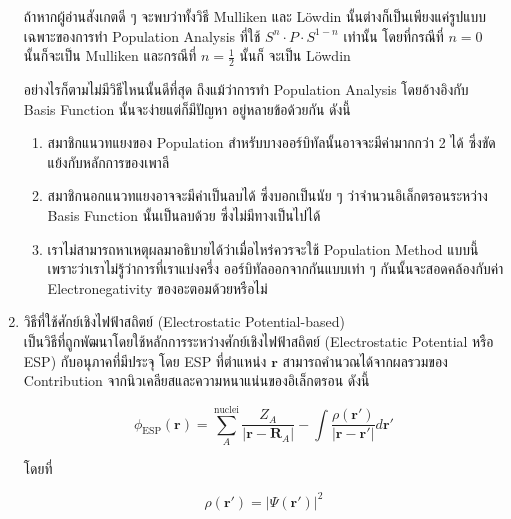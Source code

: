 \begin{enumerate}
        ถ้าหากผู้อ่านสังเกตดี ๆ จะพบว่าทั้งวิธี Mulliken และ L\"{o}wdin นั้นต่างก็เป็นเพียงแค่รูปแบบเฉพาะของการทำ Population Analysis 
        ที่ใช้ $S^{n} \cdot P \cdot S^{1-n}$ เท่านั้น โดยที่กรณีที่ $n=0$ นั้นก็จะเป็น Mulliken และกรณีที่ $n=\frac{1}{2}$ นั้นก็%
        จะเป็น L\"{o}wdin

        อย่างไรก็ตามไม่มีวิธีไหนนั้นดีที่สุด ถึงแม้ว่าการทำ Population Analysis โดยอ้างอิงกับ Basis Function นั้นจะง่ายแต่ก็มีปัญหา%
        อยู่หลายข้อด้วยกัน ดังนี้ 

        \begin{enumerate}[topsep=0pt]
            \item สมาชิกแนวทแยงของ Population สำหรับบางออร์บิทัลนั้นอาจจะมีค่ามากกว่า 2 ได้ ซึ่งขัดแย้งกับหลักการของเพาลี
            
            \item สมาชิกนอกแนวทแยงอาจจะมีค่าเป็นลบได้ ซึ่งบอกเป็นนัย ๆ ว่าจำนวนอิเล็กตรอนระหว่าง Basis Function นั้นเป็นลบด้วย%
            ซึ่งไม่มีทางเป็นไปได้

            \item เราไม่สามารถหาเหตุผลมาอธิบายได้ว่าเมื่อไหร่ควรจะใช้ Population Method แบบนี้เพราะว่าเราไม่รู้ว่าการที่เราแบ่งครึ่ง%
            ออร์บิทัลออกจากกันแบบเท่า ๆ กันนั้นจะสอดคล้องกับค่า Electronegativity ของอะตอมด้วยหรือไม่
        \end{enumerate}
    
    \item วิธีที่ใช้ศักย์เชิงไฟฟ้าสถิตย์ (Electrostatic Potential-based) \\
    
        เป็นวิธีที่ถูกพัฒนาโดยใช้หลักการระหว่างศักย์เชิงไฟฟ้าสถิตย์ (Electrostatic Potential หรือ ESP) กับอนุภาคที่มีประจุ โดย ESP
        ที่ตำแหน่ง $\bm{r}$ สามารถคำนวณได้จากผลรวมของ Contribution จากนิวเคลียสและความหนาแน่นของอิเล็กตรอน ดังนี้

        \begin{equation}\label{eq:esp_population}
            \phi_{\text{ESP}}(\bm{r}) = \sum^{\text{nuclei}}_{A} \frac{Z_{A}}{|\bm{r} - \bm{R}_{A}|} 
            - \int \frac{\rho(\bm{r}')}{|\bm{r} - \bm{r}'|} d\bm{r}'
        \end{equation}

        \noindent โดยที่ 
        
        \begin{equation}
            \rho(\bm{r}') = |\Psi(\bm{r}')|^{2}
        \end{equation}


\end{enumerate}
